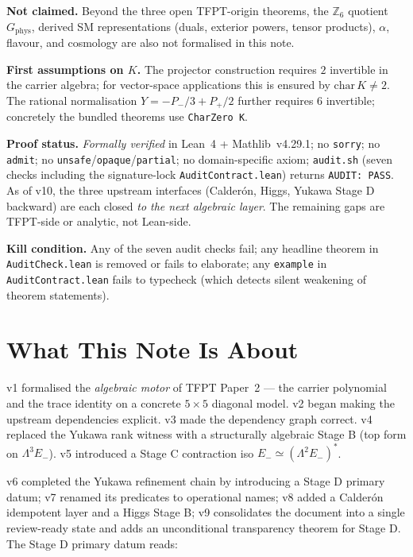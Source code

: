 \begin{tfptclaimcontract}
\textbf{Not claimed.}
Beyond the three open TFPT-origin theorems, the
$\mathbb Z_6$ quotient $G_{\mathrm{phys}}$, derived SM
representations (duals, exterior powers, tensor products),
$\alpha$, flavour, and cosmology are also not formalised
in this note.

\textbf{First assumptions on $K$.}
The projector construction requires $2$ invertible in the
carrier algebra; for vector-space applications this is ensured
by $\mathrm{char}\,K \ne 2$. The rational normalisation
$Y = -P_-/3 + P_+/2$ further requires $6$ invertible; concretely
the bundled theorems use \texttt{CharZero K}.

\textbf{Proof status.}
\emph{Formally verified} in Lean~4 + Mathlib~v4.29.1; no
\texttt{sorry}; no \texttt{admit}; no
\texttt{unsafe}/\texttt{opaque}/\texttt{partial}; no
domain-specific axiom; \texttt{audit.sh} (seven checks
including the signature-lock \texttt{AuditContract.lean})
returns \texttt{AUDIT:\ PASS}. As of v10, the three upstream
interfaces (Calder\'on, Higgs, Yukawa Stage D backward) are
each closed \emph{to the next algebraic layer}. The remaining
gaps are TFPT-side or analytic, not Lean-side.

\textbf{Kill condition.}
Any of the seven audit checks fail; any headline theorem in
\texttt{AuditCheck.lean} is removed or fails to elaborate;
any \texttt{example} in \texttt{AuditContract.lean} fails to
typecheck (which detects silent weakening of theorem statements).
\end{tfptclaimcontract}

\tableofcontents

\section{What This Note Is About}

v1 formalised the \emph{algebraic motor} of TFPT Paper~2 ---
the carrier polynomial and the trace identity on a concrete
$5\times5$ diagonal model. v2 began making the upstream
dependencies explicit. v3 made the dependency graph correct.
v4 replaced the Yukawa rank witness with a structurally
algebraic Stage B (top form on $\Lambda^3 E_-$). v5 introduced
a Stage C contraction iso $E_- \simeq (\Lambda^2 E_-)^*$.

v6 completed the Yukawa refinement chain by introducing a
Stage D primary datum; v7 renamed its predicates to operational
names; v8 added a Calder\'on idempotent layer and a Higgs Stage B;
v9 consolidates the document into a single review-ready state
and adds an unconditional transparency theorem for Stage D.
The Stage D primary datum reads:

